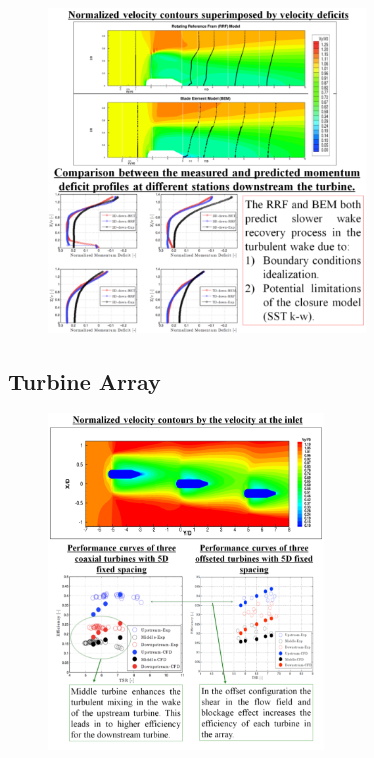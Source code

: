 \documentclass[xcolor=x11names,compress]{beamer}
\begin{document}
	\begin{frame}{}

		\begin{figure}[p]
		    \centering
		    \includegraphics[width=0.75\textwidth]{figures/validation-RANS-experiment_single-turbine_performance-and-wake-1.png}
		\end{figure}

	\end{frame}

\subsection{Turbine Array}
	
	\begin{frame}{}

		\begin{figure}[p]
		    \centering
		    \includegraphics[width=0.65\textwidth]{figures/validation-RANS-experiment_turbine-array_performance-and-wake-1.png}
		\end{figure}

	\end{frame}
\end{document}
